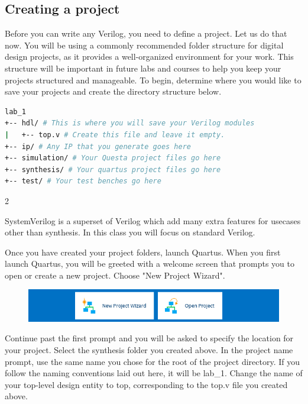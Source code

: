 \documentclass[12pt]{journal}
\begin{document}
\subsection{Creating a project}
Before you can write any Verilog, you need to define a project. Let us do that now. You will be using a commonly recommended folder structure for digital design projects, as it provides a well-organized environment for your work. This structure will be important in future labs and courses to help you keep your projects structured and manageable. To begin, determine where you would like to save your projects and create the directory structure below.
\clearpage
\begin{lstlisting}[style=console,language=sh]
lab_1
+-- hdl/ # This is where you will save your Verilog modules
|   +-- top.v # Create this file and leave it empty.
+-- ip/ # Any IP that you generate goes here
+-- simulation/ # Your Questa project files go here
+-- synthesis/ # Your quartus project files go here
+-- test/ # Your test benches go here
\end{lstlisting}
\vspace{4em}
\begin{paracol} {2}   
\switchcolumn[1]
\begin{extra}[frametitle={Verilog and System Verilog}]
    SystemVerilog is a superset of Verilog which add many extra features for usecases other than synthesis. In this class you will focus on standard Verilog.
\end{extra}
\switchcolumn[0]
Once you have created your project folders, launch Quartus. When you first launch Quartus, you will be greeted with a welcome screen that prompts you to open or create a new project. Choose "New Project Wizard".
\begin{figure}[H]
    \centering
    \includegraphics[width=\columnwidth]{newproject.png}
\end{figure}
\end{paracol}


Continue past the first prompt and you will be asked to specify the location for your project. Select the synthesis folder you created above. In the project name prompt, use the same name you chose for the root of the project directory. If you follow the naming conventions laid out here, it will be lab\_1. Change the name of your top-level design entity to top, corresponding to the top.v file you created above.
\end{document}
